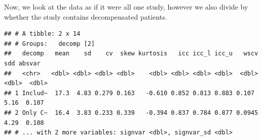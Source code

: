 \documentclass[
]{article}
\newenvironment{Shaded}{\begin{snugshade}}{\end{snugshade}}
\newcommand{\AttributeTok}[1]{\textcolor[rgb]{0.77,0.63,0.00}{#1}}
\newcommand{\DecValTok}[1]{\textcolor[rgb]{0.00,0.00,0.81}{#1}}
\newcommand{\FunctionTok}[1]{\textcolor[rgb]{0.00,0.00,0.00}{#1}}
\newcommand{\NormalTok}[1]{#1}
\newcommand{\OtherTok}[1]{\textcolor[rgb]{0.56,0.35,0.01}{#1}}
\newcommand{\SpecialCharTok}[1]{\textcolor[rgb]{0.00,0.00,0.00}{#1}}
\newcommand{\StringTok}[1]{\textcolor[rgb]{0.31,0.60,0.02}{#1}}
\begin{document}
Now, we look at the data as if it were all one study, however we also
divide by whether the study contains decompensated patients.

\begin{Shaded}
\end{Shaded}

\begin{verbatim}
## # A tibble: 2 x 14
## # Groups:   decomp [2]
##   decomp   mean    sd    cv  skew kurtosis   icc icc_l icc_u   wscv   sdd absvar
##   <chr>   <dbl> <dbl> <dbl> <dbl>    <dbl> <dbl> <dbl> <dbl>  <dbl> <dbl>  <dbl>
## 1 Includ~  17.3  4.83 0.279 0.163   -0.610 0.852 0.813 0.883 0.107   5.16  0.107
## 2 Only C~  16.4  3.83 0.233 0.339   -0.394 0.837 0.784 0.877 0.0945  4.29  0.108
## # ... with 2 more variables: signvar <dbl>, signvar_sd <dbl>
\end{verbatim}
\end{document}
